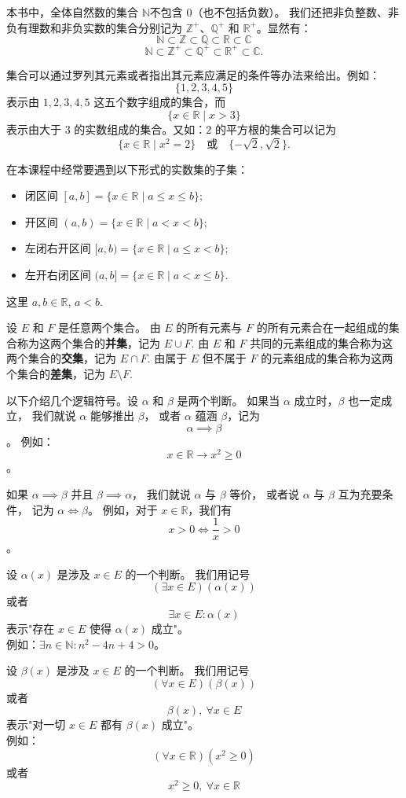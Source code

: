 \documentclass[12pt,a4paper,oneside,utf8]{ctexbook}
\begin{document}
本书中，全体自然数的集合 \(\mathbb{N}\)不包含 \(0\)（也不包括负数）。
我们还把非负整数、非负有理数和非负实数的集合分别记为 \(\mathbb{Z}^+\)、\(\mathbb{Q}^+\) 和 \(\mathbb{R}^+\)。显然有：
\[
\mathbb{N} \subset \mathbb{Z} \subset \mathbb{Q} \subset \mathbb{R} \subset \mathbb{C}
\] 
\[ 
\mathbb{N} \subset \mathbb{Z}^+ \subset \mathbb{Q}^+ \subset \mathbb{R}^+ \subset \mathbb{C}.
\]

集合可以通过罗列其元素或者指出其元素应满足的条件等办法来给出。例如：
\[
\{1,2,3,4,5\}
\]
表示由 \(1,2,3,4,5\) 这五个数字组成的集合，而
\[
\{x \in \mathbb{R} \mid x>3\}
\]
表示由大于 \(3\) 的实数组成的集合。又如：\(2\) 的平方根的集合可以记为
\[
\{x \in \mathbb{R} \mid x^2=2\}
\quad \text{或} \quad 
\{ -\sqrt{2}, \sqrt{2} \}.
\]

在本课程中经常要遇到以下形式的实数集的子集：
\begin{itemize}
\item 闭区间 \([a,b] = \{x \in \mathbb{R} \mid a \leq x \leq b\}\);
\item 开区间 \((a,b) = \{x \in \mathbb{R} \mid a < x < b\}\);
\item 左闭右开区间 \([a,b) = \{x \in \mathbb{R} \mid a \leq x < b\}\);
\item 左开右闭区间 \((a,b] = \{x \in \mathbb{R} \mid a < x \leq b\}\).
\end{itemize}
这里 \(a, b \in \mathbb{R}\), \(a < b\).

设 \(E\) 和 \(F\) 是任意两个集合。
由 \(E\) 的所有元素与 \(F\) 的所有元素合在一起组成的集合称为这两个集合的\textbf{并集}，记为 \(E \cup F\).
由 \(E\) 和 \(F\) 共同的元素组成的集合称为这两个集合的\textbf{交集}，记为 \(E \cap F\).
由属于 \(E\) 但不属于 \(F\) 的元素组成的集合称为这两个集合的\textbf{差集}，记为 \(E \setminus F\).


以下介绍几个逻辑符号。设 \(\alpha\) 和 \(\beta\) 是两个判断。
如果当 \(\alpha\) 成立时，\(\beta\) 也一定成立，
我们就说 \(\alpha\) 能够推出 \(\beta\)，
或者 \(\alpha\) 蕴涵 \(\beta\)，记为
 \[\alpha \implies \beta\]。
例如：\[x \in \mathbb{R} \to x^2 \geq 0\]。
    
如果 \(\alpha \implies \beta\) 并且 \(\beta \implies \alpha\)，
我们就说 \(\alpha\) 与 \(\beta\) 等价，
或者说 \(\alpha\) 与 \(\beta\) 互为充要条件，
记为 \(\alpha \iff \beta\)。
例如，对于 \(x \in \mathbb{R}\)，我们有 
\[x > 0 \iff \frac{1}{x} > 0\]。


设 \(\alpha(x)\) 是涉及 \(x \in E\) 的一个判断。
我们用记号 \[(\exists x \in E)(\alpha(x))\]
或者 \[\exists x \in E: \alpha(x)\]
表示"存在 \(x \in E\) 使得 \(\alpha(x)\) 成立"。\\

例如：\(\exists n \in \mathbb{N}: n^2 - 4n + 4 > 0\)。

设 \(\beta(x)\) 是涉及 \(x \in E\) 的一个判断。
我们用记号 \[(\forall x \in E)(\beta(x))\]
或者 \[\beta(x),\ \forall x \in E\]
表示"对一切 \(x \in E\) 都有 \(\beta(x)\) 成立"。\\
例如：\[(\forall x \in \mathbb{R})(x^2 \geq 0)\]
或者 \[x^2 \geq 0,\ \forall x \in \mathbb{R}\]

\ifx\allfiles\undefined %
\end{document}
